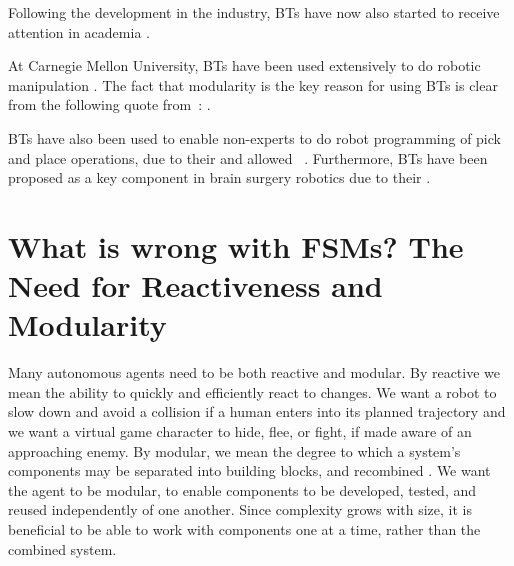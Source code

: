 Following the development in the industry, BTs have now also started to receive attention in academia \cite{lim2010evolving,Nicolau2016,shoulson2011parameterizing,bojic2011extending,ogren,Marzinotto14,Bagnell2012b,klockner2013,Colledanchise14, bart,hu2015ablation,guerin2015manufacturing}.

At Carnegie Mellon University, BTs have been used extensively to do robotic manipulation \cite{Bagnell2012b, bart}. 
The fact that modularity is the key reason for using BTs is clear from the following quote from~\cite{Bagnell2012b}:
 .

BTs have also been used to enable non-experts to do robot programming of pick and place operations,
due to their 
\cite{guerin2015manufacturing} and allowed ~\cite{paxton2016costar}. Furthermore, BTs have been proposed as a key component in brain surgery robotics due to their  \cite{hu2015ablation}.


%
%



\section{What is wrong with FSMs? The Need for Reactiveness and Modularity}
\label{sec:modularity}

Many autonomous agents need to be both reactive and modular.
By reactive we mean the ability to quickly and efficiently react to changes.
We want a robot to slow down and avoid a collision if a human enters into its planned trajectory and we want a virtual game character to hide, flee, or fight, if made aware of an approaching enemy.
By modular, we mean the degree to which a system's components may be separated into building blocks, and recombined \cite{gershenson2003product}. 
We want the agent to be modular, to enable components to be developed, tested, and reused independently of one another. Since complexity grows with size, it is  beneficial to be able to work with components one at a time, rather than the combined system.

